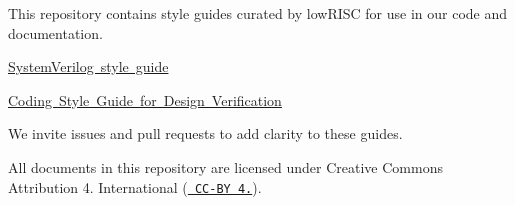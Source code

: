 This repository contains style guides curated by low\+RISC for use in our code and documentation.


\begin{DoxyItemize}
\item \mbox{\hyperlink{group__SVmodule}{System\+Verilog style guide}}
\item \mbox{\hyperlink{group__SVmodule}{Coding Style Guide for Design Verification}}
\end{DoxyItemize}

We invite issues and pull requests to add clarity to these guides.

All documents in this repository are licensed under Creative Commons Attribution 4. International (\href{https://creativecommons.org/licenses/by/4.0/deed}{\texttt{ CC-\/\+BY 4.}}). 